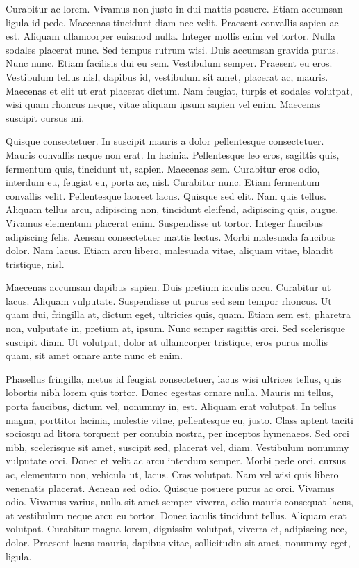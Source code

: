 \documentclass{article}
\begin{document}
Curabitur ac lorem. Vivamus non justo in dui mattis posuere. Etiam accumsan
ligula id pede. Maecenas tincidunt diam nec velit. Praesent convallis sapien ac
est. Aliquam ullamcorper euismod nulla. Integer mollis enim vel tortor. Nulla
sodales placerat nunc. Sed tempus rutrum wisi. Duis accumsan gravida purus.
Nunc nunc. Etiam facilisis dui eu sem. Vestibulum semper. Praesent eu eros.
Vestibulum tellus nisl, dapibus id, vestibulum sit amet, placerat ac, mauris.
Maecenas et elit ut erat placerat dictum. Nam feugiat, turpis et sodales
volutpat, wisi quam rhoncus neque, vitae aliquam ipsum sapien vel enim.
Maecenas suscipit cursus mi.

Quisque consectetuer. In suscipit mauris a dolor pellentesque consectetuer.
Mauris convallis neque non erat. In lacinia. Pellentesque leo eros, sagittis
quis, fermentum quis, tincidunt ut, sapien. Maecenas sem. Curabitur eros odio,
interdum eu, feugiat eu, porta ac, nisl. Curabitur nunc. Etiam fermentum
convallis velit. Pellentesque laoreet lacus. Quisque sed elit. Nam quis tellus.
Aliquam tellus arcu, adipiscing non, tincidunt eleifend, adipiscing quis,
augue. Vivamus elementum placerat enim. Suspendisse ut tortor. Integer faucibus
adipiscing felis. Aenean consectetuer mattis lectus. Morbi malesuada faucibus
dolor. Nam lacus. Etiam arcu libero, malesuada vitae, aliquam vitae, blandit
tristique, nisl.

Maecenas accumsan dapibus sapien. Duis pretium iaculis arcu. Curabitur ut
lacus. Aliquam vulputate. Suspendisse ut purus sed sem tempor rhoncus. Ut quam
dui, fringilla at, dictum eget, ultricies quis, quam. Etiam sem est, pharetra
non, vulputate in, pretium at, ipsum. Nunc semper sagittis orci. Sed
scelerisque suscipit diam. Ut volutpat, dolor at ullamcorper tristique, eros
purus mollis quam, sit amet ornare ante nunc et enim.

Phasellus fringilla, metus id feugiat consectetuer, lacus wisi ultrices
tellus, quis lobortis nibh lorem quis tortor. Donec egestas ornare nulla.
Mauris mi tellus, porta faucibus, dictum vel, nonummy in, est. Aliquam erat
volutpat. In tellus magna, porttitor lacinia, molestie vitae, pellentesque eu,
justo. Class aptent taciti sociosqu ad litora torquent per conubia nostra, per
inceptos hymenaeos. Sed orci nibh, scelerisque sit amet, suscipit sed, placerat
vel, diam. Vestibulum nonummy vulputate orci. Donec et velit ac arcu interdum
semper. Morbi pede orci, cursus ac, elementum non, vehicula ut, lacus. Cras
volutpat. Nam vel wisi quis libero venenatis placerat. Aenean sed odio. Quisque
posuere purus ac orci. Vivamus odio. Vivamus varius, nulla sit amet semper
viverra, odio mauris consequat lacus, at vestibulum neque arcu eu tortor. Donec
iaculis tincidunt tellus. Aliquam erat volutpat. Curabitur magna lorem,
dignissim volutpat, viverra et, adipiscing nec, dolor. Praesent lacus mauris,
dapibus vitae, sollicitudin sit amet, nonummy eget, ligula.
\end{document}
